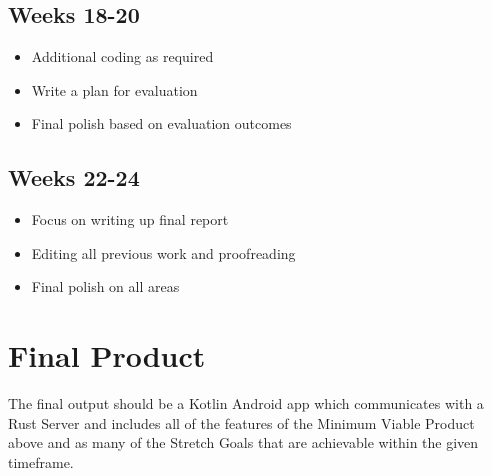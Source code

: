 \documentclass{mproj}
\begin{document}
\subsection{Weeks 18-20}
\begin{itemize}
    \item Additional coding as required
    \item Write a plan for evaluation
    \item Final polish based on evaluation outcomes
\end{itemize}

\subsection{Weeks 22-24}
\begin{itemize}
    \item Focus on writing up final report
    \item Editing all previous work and proofreading
    \item Final polish on all areas
\end{itemize}

\section{Final Product}
The final output should be a Kotlin Android app which communicates with a Rust Server and includes all of the features of the Minimum Viable Product above and as many of the Stretch Goals that are achievable within the given timeframe.








\end{document}

